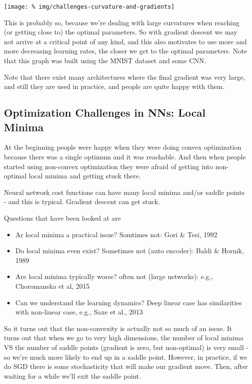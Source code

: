 \documentclass[a2paper,8pt]{extarticle}
\newcommand{\ssep}{\hdashrule[1.1ex]{\linewidth}{0.1pt}{0.3mm}\vspace{-6pt}}
\newcommand{\ssep}{\hdashrule[1.1ex]{\linewidth}{0.1pt}{0.3mm}\vspace{-3pt}}
\begin{document}
\begin{landscape}
\begin{multicols*}{7}
\begin{center}
  \texttt{[image: \%
img/challenges-curvature-and-gradients]}
\end{center}

This is probably so, because we're dealing with large curvatures when reaching
(or getting close to) the optimal parameters. So with gradient descent we may
not arrive at a critical point of any kind, and this also motivates to use more
and more decreasing learning rates, the closer we get to the optimal parameters.
Note that this graph was built using the MNIST dataset and some CNN.

Note that there exist many architectures where the final gradient was very
large, and still they are used in practice, and people are quite happy with
them.

\subsection{Optimization Challenges in NNs: Local Minima}

At the beginning people were happy when they were doing convex optimization
because there was a single optimum and it was reachable. And then when people
started using non-convex optimization they were afraid of getting into
non-optimal local minima and getting stuck there.

\ssep

Neural network cost functions can have many local minima and/or saddle points -
and this is typical. Gradient descent can get stuck.

Questions that have been looked at are
\begin{itemize}
  \item Ar local minima a practical issue? Somtimes not: Gori \& Tesi, 1992
  \item Do local minima even exist? Sometimes not (auto encoder): Baldi \&
  Hornik, 1989
  \item Are local minima typically worse? often not (large networks): e.g.,
  Choromanska et al, 2015
  \item Can we understand the learning dynamics? Deep linear case has
  similarities with non-linear case, e.g., Saxe et al., 2013
\end{itemize}

So it turns out that the non-convexity is actually not so much of an issue. It
turns out that when we go to very high dimensions, the number of local minima VS
the number of saddle points (gradient is zero, but non-optimal) is very small -
so we're much more likely to end up in a saddle point. However, in practice, if
we do SGD there is some stochasticity that will make our gradient move. Then,
after waiting for a while we'll exit the saddle point.


\end{multicols*}
\end{landscape}
\end{document}
